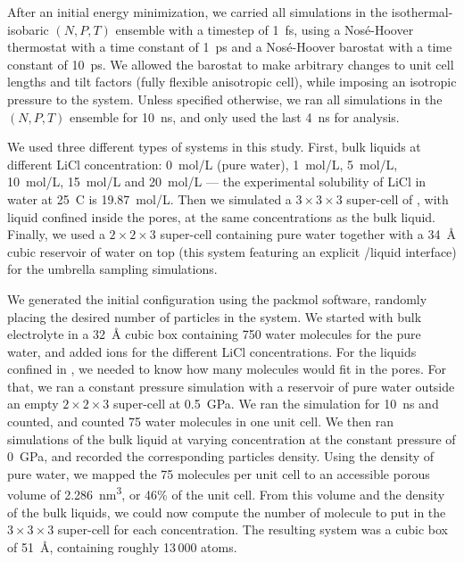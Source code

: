 \documentclass[thesis]{subfiles}
\begin{document}
After an initial energy minimization, we carried all simulations in the
isothermal-isobaric $(N, P, T)$ ensemble with a timestep of \SI{1}{fs}, using a
Nosé-Hoover thermostat with a time constant of \SI{1}{ps} and a Nosé-Hoover
barostat with a time constant of \SI{10}{ps}. We allowed the barostat to make
arbitrary changes to unit cell lengths and tilt factors (fully flexible
anisotropic cell), while imposing an isotropic pressure to the system. Unless
specified otherwise, we ran all simulations in the $(N, P, T)$ ensemble for
\SI{10}{ns}, and only used the last \SI{4}{ns} for analysis.

We used three different types of systems in this study. First, bulk liquids at
different LiCl concentration: \SI{0}{mol/L} (pure water), \SI{1}{mol/L},
\SI{5}{mol/L}, \SI{10}{mol/L}, \SI{15}{mol/L} and \SI{20}{mol/L} --- the
experimental solubility of LiCl in water at 25~{\textdegree C} is
\SI{19.87}{mol/L}. Then we simulated a $3\times3\times3$ super-cell of ,
with liquid confined inside the pores, at the same concentrations as the bulk
liquid. Finally, we used a $2\times2\times3$  super-cell containing pure
water together with a \SI{34}{\angstrom} cubic reservoir of water on top (this
system featuring an explicit /liquid interface) for the umbrella sampling
simulations.

We generated the initial configuration using the packmol
software\cite{Martnez2009}, randomly placing the desired number of particles in
the system. We started with bulk electrolyte in a \SI{32}{\angstrom} cubic box
containing 750 water molecules for the pure water, and added ions for the
different LiCl concentrations. For the liquids confined in , we needed to
know how many molecules would fit in the  pores. For that, we ran a
constant pressure simulation with a reservoir of pure water outside an empty
$2\times2\times3$  super-cell at \SI{0.5}{GPa}. We ran the simulation for
\SI{10}{ns} and counted, and counted 75 water molecules in one unit cell. We
then ran simulations of the bulk liquid at varying concentration at the constant
pressure of \SI{0}{GPa}, and recorded the corresponding particles density. Using
the density of pure water, we mapped the 75 molecules per unit cell to an
accessible porous volume of \SI{2.286}{nm^3}, or {46\%} of the unit cell. From
this volume and the density of the bulk liquids, we could now compute the number
of molecule to put in the $3\times3\times3$ super-cell for each concentration.
The resulting system was a cubic box of \SI{51}{\angstrom}, containing roughly
13\,000 atoms.
\end{document}
